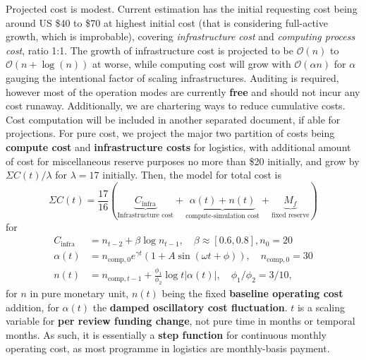\documentclass[9pt,a4paper]{article}
\begin{document}
Projected cost is modest. Current estimation has the initial requesting cost being around US \$40 to \$70 at highest initial cost (that is considering full-active growth, which is improbable), covering \textit{infrastructure cost} and \textit{computing process cost}, ratio 1:1. The growth of infrastructure cost is projected to be $\mathcal{O}(n)$ to $\mathcal{O}(n+\log{(n)})$ at worse, while computing cost will grow with $\mathcal{O}(\alpha n)$ for $\alpha$ gauging the intentional factor of scaling infrastructures. Auditing is required, however most of the operation modes are currently \textbf{free} and should not incur any cost runaway. Additionally, we are chartering ways to reduce cumulative costs. Cost computation will be included in another separated document, if able for projections. For pure cost, we project the major two partition of costs being \textbf{compute cost} and \textbf{infrastructure costs} for logistics, with additional amount of cost for miscellaneous reserve purposes no more than \$20 initially, and grow by $\Sigma C(t)/\lambda$ for $\lambda=17$ initially. Then, the model for total cost is
\begin{equation}
    \Sigma C(t) = \frac{17}{16} \left(\underbrace{C_{\mathrm{infra}}}_{\text{Infrastructure cost}} + \underbrace{\alpha(t) + n(t)}_{\text{compute-simulation cost}} + \underbrace{M_{f}}_{\text{fixed reserve}}\right)
\end{equation}
for
\begin{align}
    C_{\mathrm{infra}} &= n_{t-2} + \beta \log{n_{t-1}}, \quad \beta \approx [0.6,0.8], n_{0} = 20 \\
    \alpha(t) &= n_{\mathrm{comp},0}e^{\gamma t} (1+A\sin{(\omega t + \phi)}), \quad n_{\mathrm{comp},0} = 30 \\
    n(t) &= n_{\mathrm{comp},t-1} + \frac{\phi_{1}}{\phi_{2}}\log{t}|\alpha(t)|, \quad \phi_{1}/\phi_{2} = 3/10,
\end{align}
for $n$ in pure monetary unit, $n(t)$ being the fixed \textbf{baseline operating cost} addition, for $\alpha(t)$ the \textbf{damped oscillatory cost fluctuation}. $t$ is a scaling variable for \textbf{per review funding change}, not pure time in months or temporal months. As such, it is essentially a \textbf{step function} for continuous monthly operating cost, as most programme in logistics are monthly-basis payment. 


% 
% 







\end{document}
